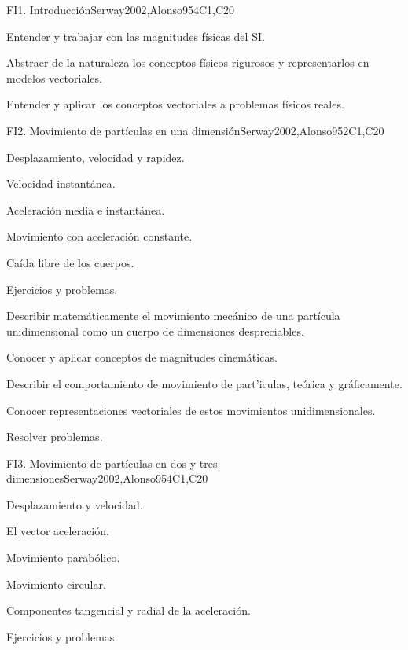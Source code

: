\begin{syllabus}
\begin{unit}{FI1. Introducción}{}{Serway2002,Alonso95}{4}{C1,C20}
   \begin{learningoutcomes}
      \item Entender y trabajar con las magnitudes físicas del SI.
      \item Abstraer de la naturaleza los conceptos físicos rigurosos y representarlos en modelos vectoriales.
      \item Entender y aplicar los conceptos vectoriales a problemas físicos reales.
   \end{learningoutcomes}
\end{unit}

\begin{unit}{FI2. Movimiento de partículas en una dimensión}{}{Serway2002,Alonso95}{2}{C1,C20}
\begin{topics}
      \item Desplazamiento, velocidad y rapidez.
      \item Velocidad instantánea.
      \item Aceleración media e instantánea.
      \item Movimiento con aceleración constante.
      \item Caída libre de los cuerpos.
      \item Ejercicios y problemas.
    \end{topics}
   \begin{learningoutcomes}
      \item Describir matemáticamente el movimiento mecánico de una partícula unidimensional como un cuerpo de dimensiones despreciables.
      \item Conocer y aplicar conceptos de magnitudes cinemáticas.
      \item Describir el comportamiento de movimiento de part'iculas, teórica y gráficamente.
      \item Conocer representaciones vectoriales de estos movimientos unidimensionales.
      \item Resolver problemas.
   \end{learningoutcomes}
\end{unit}

\begin{unit}{FI3. Movimiento de partículas en dos y tres dimensiones}{}{Serway2002,Alonso95}{4}{C1,C20}
\begin{topics}
      \item Desplazamiento y velocidad.
      \item El vector aceleración.
      \item Movimiento parabólico.
      \item Movimiento circular.
      \item Componentes tangencial y radial de la aceleración.
      \item Ejercicios y problemas
\end{topics}


\end{unit}
\end{syllabus}
